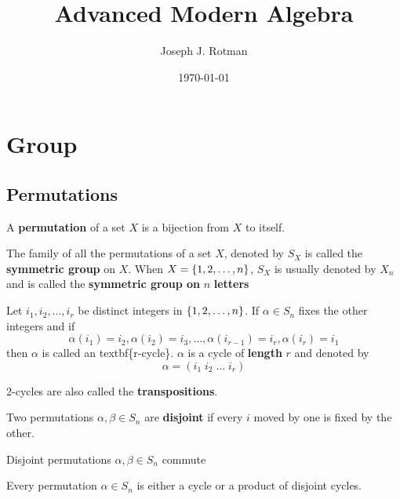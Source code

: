 \documentclass[11pt]{article}
\author{Joseph J. Rotman}
\date{\today}
\title{Advanced Modern Algebra}
\begin{document}
\maketitle
\tableofcontents \clearpage
\section{Group }
\label{sec:orgb5b47d9}
\subsection{Permutations}
\label{sec:orgb90d65f}
\begin{definition}[]
A \textbf{permutation} of a set \(X\) is a bijection from \(X\) to itself.
\end{definition}


\begin{definition}[]
The family of all the permutations of a set \(X\), denoted by \(S_X\) is called
the \textbf{symmetric group} on \(X\). When \(X=\left\{ 1,2,\dots,n\right\}\), \(S_X\) is
usually denoted by \(X_n\) and is called the \textbf{symmetric group on } \(n\)
\textbf{letters} 
\end{definition}

\begin{definition}[]
Let \(i_1,i_2,\dots,i_r\) be distinct integers in \(\left\{ 1,2,\dots,n\right\}\). If
\(\alpha\in S_n\) fixes the other integers and if
\begin{equation*}
\alpha(i_1)=i_2,\alpha(i_2)=i_3,\dots,\alpha(i_{r-1})=i_r,\alpha(i_r)=i_1
\end{equation*}
then \(\alpha\) is called an textbf\{r-cycle\}. \(\alpha\) is a cycle of
\textbf{length} \(r\) and denoted by
\begin{equation*}
\alpha=(i_1\; i_2\;\dots\; i_r)
\end{equation*}
\end{definition}

2-cycles are also called the \textbf{transpositions}.

\begin{definition}[]
Two permutations \(\alpha,\beta\in S_n\) are \textbf{disjoint} if every \(i\)
moved by one is fixed by the other.
\end{definition}

\begin{lemma}[]
Disjoint permutations \(\alpha,\beta\in S_n\) commute
\end{lemma}

\begin{proposition}[]
Every permutation \(\alpha\in S_n\) is either a cycle or a product of disjoint cycles.
\end{proposition}
\end{document}
